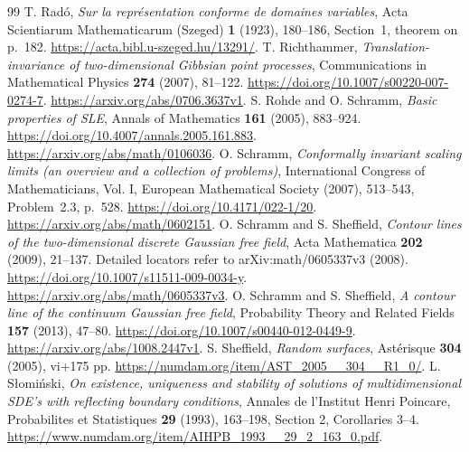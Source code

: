 \documentclass[11pt]{article}
\theoremstyle{definition}
\theoremstyle{remark}
\numberwithin{equation}{section}
\begin{document}
\begin{thebibliography}{99}
 T. Rad\'o,
\emph{Sur la repr\'esentation conforme de domaines variables},
Acta Scientiarum Mathematicarum (Szeged) \textbf{1} (1923), 180--186,
Section~1, theorem on p.~182.
\url{https://acta.bibl.u-szeged.hu/13291/}.
 T. Richthammer,
\emph{Translation-invariance of two-dimensional Gibbsian point processes},
Communications in Mathematical Physics \textbf{274} (2007), 81--122.
\url{https://doi.org/10.1007/s00220-007-0274-7}.
\url{https://arxiv.org/abs/0706.3637v1}.
 S. Rohde and O. Schramm,
\emph{Basic properties of SLE},
Annals of Mathematics \textbf{161} (2005), 883--924.
\url{https://doi.org/10.4007/annals.2005.161.883}.
\url{https://arxiv.org/abs/math/0106036}.
 O. Schramm,
\emph{Conformally invariant scaling limits (an overview and a collection
of problems)}, International Congress of Mathematicians, Vol. I,
European Mathematical Society (2007), 513--543, Problem~2.3, p.~528.
\url{https://doi.org/10.4171/022-1/20}.
\url{https://arxiv.org/abs/math/0602151}.
 O. Schramm and S. Sheffield,
\emph{Contour lines of the two-dimensional discrete Gaussian free field},
Acta Mathematica \textbf{202} (2009), 21--137.
Detailed locators refer to arXiv:math/0605337v3 (2008).
\url{https://doi.org/10.1007/s11511-009-0034-y}.
\url{https://arxiv.org/abs/math/0605337v3}.
 O. Schramm and S. Sheffield,
\emph{A contour line of the continuum Gaussian free field},
Probability Theory and Related Fields \textbf{157} (2013), 47--80.
\url{https://doi.org/10.1007/s00440-012-0449-9}.
\url{https://arxiv.org/abs/1008.2447v1}.
 S. Sheffield,
\emph{Random surfaces}, Ast\'erisque \textbf{304} (2005), vi+175 pp.
\url{https://numdam.org/item/AST_2005__304__R1_0/}.
 L. S\l omi\'nski,
\emph{On existence, uniqueness and stability of solutions of multidimensional
SDE's with reflecting boundary conditions}, Annales de l'Institut Henri
Poincare, Probabilites et Statistiques \textbf{29} (1993), 163--198,
Section 2, Corollaries 3--4.
\url{https://www.numdam.org/item/AIHPB_1993__29_2_163_0.pdf}.
\end{thebibliography}
\end{document}
